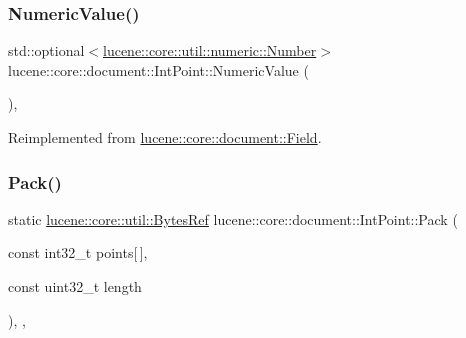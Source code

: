 \subsubsection{\texorpdfstring{Numeric\+Value()}{NumericValue()}}
{\footnotesize\ttfamily std\+::optional$<$\mbox{\hyperlink{classlucene_1_1core_1_1util_1_1numeric_1_1Number}{lucene\+::core\+::util\+::numeric\+::\+Number}}$>$ lucene\+::core\+::document\+::\+Int\+Point\+::\+Numeric\+Value (\begin{DoxyParamCaption}{ }\end{DoxyParamCaption})\hspace{0.3cm}{\ttfamily [inline]}, {\ttfamily [virtual]}}



Reimplemented from \mbox{\hyperlink{classlucene_1_1core_1_1document_1_1Field_a858814043215c98bacf6ecc823d078ea}{lucene\+::core\+::document\+::\+Field}}.

\mbox{\label{classlucene_1_1core_1_1document_1_1IntPoint_ab72dd15b82e4c9807910db3b2ac3a737}} 
\subsubsection{\texorpdfstring{Pack()}{Pack()}}
{\footnotesize\ttfamily static \mbox{\hyperlink{classlucene_1_1core_1_1util_1_1BytesRef}{lucene\+::core\+::util\+::\+Bytes\+Ref}} lucene\+::core\+::document\+::\+Int\+Point\+::\+Pack (\begin{DoxyParamCaption}\item[{const int32\+\_\+t}]{points\mbox{[}$\,$\mbox{]},  }\item[{const uint32\+\_\+t}]{length }\end{DoxyParamCaption})\hspace{0.3cm}{\ttfamily [inline]}, {\ttfamily [static]}, {\ttfamily [private]}}

\mbox{\label{classlucene_1_1core_1_1document_1_1IntPoint_a288c85e2568bf186de1dac119c91ae2f}} 
